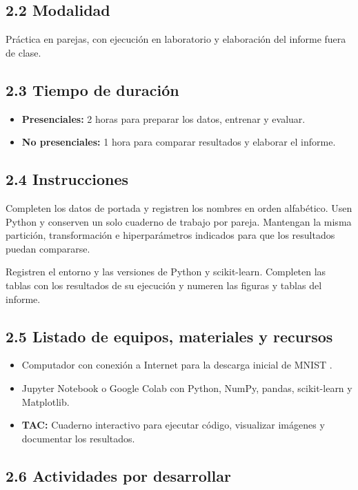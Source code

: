 \documentclass[11pt,a4paper]{article}
\begin{document}
\subsection*{2.2 Modalidad}
Práctica en parejas, con ejecución en laboratorio y elaboración del informe fuera de clase.

\subsection*{2.3 Tiempo de duración}
\begin{itemize}[leftmargin=*,noitemsep]
    \item \textbf{Presenciales:} 2 horas para preparar los datos, entrenar y evaluar.
    \item \textbf{No presenciales:} 1 hora para comparar resultados y elaborar el informe.
\end{itemize}

\subsection*{2.4 Instrucciones}
Completen los datos de portada y registren los nombres en orden alfabético. Usen Python y conserven un solo cuaderno de trabajo por pareja. Mantengan la misma partición, transformación e hiperparámetros indicados para que los resultados puedan compararse.

Registren el entorno y las versiones de Python y scikit-learn. Completen las tablas con los resultados de su ejecución y numeren las figuras y tablas del informe.

\subsection*{2.5 Listado de equipos, materiales y recursos}
\begin{itemize}[leftmargin=*,noitemsep]
    \item Computador con conexión a Internet para la descarga inicial de MNIST \cite{openml_mnist}.
    \item Jupyter Notebook o Google Colab con Python, NumPy, pandas, scikit-learn y Matplotlib.
    \item \textbf{TAC:} Cuaderno interactivo para ejecutar código, visualizar imágenes y documentar los resultados.
\end{itemize}

\subsection*{2.6 Actividades por desarrollar}
\end{document}
